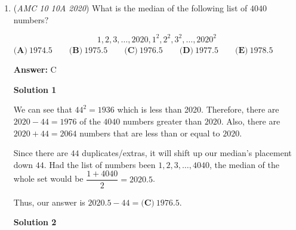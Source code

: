 \begin{enumerate}
\textbf{Solution 7 (Going from Bottom to Top)}

The surface area of the bottom cube is the bottom face, the 4 side faces, and the top face minus the bottom face of the next cube. Therefore, the surface area of the bottom cube is 6 faces minus the bottom face of the next cube. That will be $6 \cdot 49-36$. For the next cube, we take the 4 side faces and the top face, and subtract the bottom face of the next cube. Therefore, the surface area of the next cube will be 5 of its faces minus the bottom face of the next cube. That will be $5 \cdot 36-25$. We can do the next cube the same way. It will end up  as $5 \cdot 25-16$. From here we start noticing a pattern. The next will be $5 \cdot 16-9$, and then $5 \cdot 9-4$, next $5 \cdot 4-1$, and to include the top cube, we have to add $5 \cdot 1$, which is basically $5 \cdot 1-0$. Now, putting it all together, we get $6 \cdot 49-36+5 \cdot 36-25+5 \cdot 25-16+5 \cdot 16-9+5 \cdot 9-4+5 \cdot 4-1+5 \cdot 1-0=6 \cdot 49+5(36+25+16+9+4+1)-(36+25+16+9+4+1)=6 \cdot 49+4(36+25+16+9+4+1)=294+4(91)=294+364=\boxed{\textbf{(B) }658}$.

 Education, The Study of Everything

 


	\item (\textit{AMC 10 10A 2020}) What is the median of the following list of $4040$ numbers$?$

 \[1, 2, 3, \ldots, 2020, 1^2, 2^2, 3^2, \ldots, 2020^2\]
$\textbf{(A)}\ 1974.5\qquad\textbf{(B)}\ 1975.5\qquad\textbf{(C)}\ 1976.5\qquad\textbf{(D)}\ 1977.5\qquad\textbf{(E)}\ 1978.5$

 \textbf{Answer: }C



\textbf{Solution 1}

We can see that $44^2=1936$ which is less than 2020. Therefore, there are $2020-44=1976$ of the $4040$ numbers greater than $2020$. Also, there are $2020+44=2064$ numbers that are less than or equal to $2020$. 

 Since there are $44$ duplicates/extras, it will shift up our median's placement down $44$. Had the list of numbers been $1,2,3, \dots, 4040$, the median of the whole set would be $\dfrac{1+4040}{2}=2020.5$. 

 Thus, our answer is $2020.5-44=\boxed{\textbf{(C)}\ 1976.5}$.

 



\textbf{Solution 2}


\end{enumerate}

